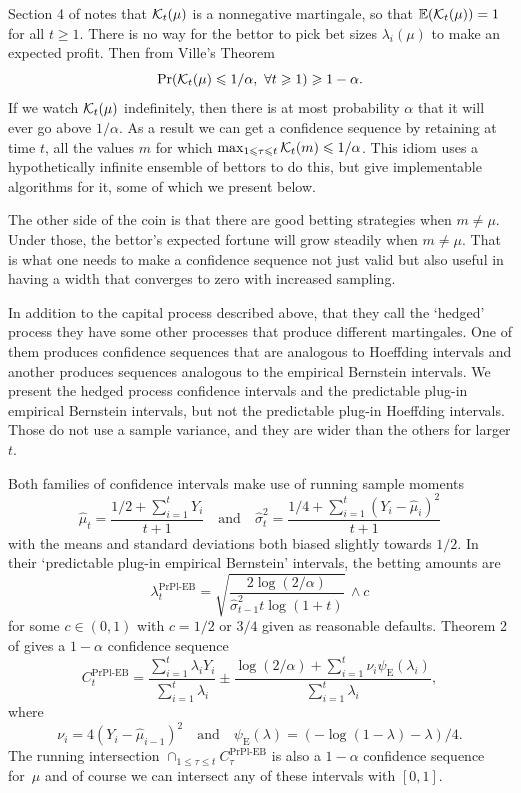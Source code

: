 \documentclass{article}
\newcommand{\art}[1]{\begingroup\color{blue}#1\endgroup}
\renewcommand{\le}{\leqslant}
\renewcommand{\ge}{\geqslant}
\newcommand{\e}{\mathbb{E}}
\newcommand{\prpleb}{\text{PrPl-EB}}
\newcommand{\eb}{\mathrm{E}}
\begin{document}
Section 4 of \cite{WauRam24a} notes that $\mathcal{K}_t(\mu)$ is
a \art{nonnegative} martingale, so that $\e(\ck_t(\mu))=1$ for all $t\ge1$.
There is no way for the bettor to pick bet sizes $\lambda_i(\mu)$
to make an expected profit.   \art{Then from Ville's Theorem}
$$
\Pr( \ck_t(\mu)\le 1/\alpha,\ \forall t\ge1)\ge1-\alpha.
$$
If we watch $\mathcal{K}_t(\mu)$ indefinitely, then
there is at most probability $\alpha$ that it will
ever go above $1/\alpha$.  As a result we can get
a confidence sequence by retaining at time $t$,
all the values $m$ for 
which $\max_{1\le\tau\le t}\ck_t(m)\le1/\alpha$.
This idiom uses a hypothetically infinite ensemble of 
bettors to do this, but \cite{WauRam24a} give
implementable algorithms for it, some of which we present below.

The other side of the coin is that there are good betting
strategies when $m\ne\mu$.  Under those, the bettor's expected fortune
will grow steadily when $m\ne\mu$. That is what one needs
to make a confidence sequence not just valid but also useful
in having a width that converges to zero with increased sampling.




In addition to the capital process described
above, \art{that they call the `hedged' process}
they have some other processes that
produce different martingales. One of them produces confidence
sequences that are analogous to Hoeffding intervals
and another produces sequences analogous to the
empirical Bernstein intervals.  \art{We present the 
hedged process confidence intervals and the
predictable plug-in empirical Bernstein
intervals, but not the predictable plug-in Hoeffding intervals. Those
do not use a sample variance, and they are wider than the others for 
larger $t$.}


Both families of confidence intervals make use of running sample moments
$$
\hat\mu_t = \frac{1/2+\sum_{i=1}^tY_i}{t+1}
\quad\text{and}\quad
\hat\sigma^2_t = \frac{1/4+\sum_{i=1}^t(Y_i-\hat\mu_i)^2}{t+1}
$$
with the means and standard deviations 
both biased slightly towards $1/2$.
\art{In their `predictable plug-in empirical Bernstein'
intervals, the betting amounts are}
$$
\lambda_t^\prpleb  = \sqrt{\frac{2\log(2/\alpha)}{\hat\sigma^2_{t-1}t\log(1+t)}}\,\wedge c
$$
for some $c\in(0,1)$ with $c=1/2$ or $3/4$
given as reasonable defaults. 
Theorem 2 of \cite{WauRam24a} 
gives a $1-\alpha$ confidence sequence
$$
C_t^\prpleb = \frac{\sum_{i=1}^t\lambda_iY_i}{\sum_{i=1}^t\lambda_i}
\pm \frac{\log(2/\alpha)+\sum_{i=1}^t\nu_i\psi_{\eb}(\lambda_i)}{\sum_{i=1}^t\lambda_i},
$$
where
$$
\nu_i = 4(Y_i-\hat\mu_{i-1})^2
\quad\text{and}\quad \psi_{\eb}(\lambda)
= (-\log(1-\lambda)-\lambda)/4.
$$
The running intersection
$\cap_{1\le\tau\le t}C^\prpleb_\tau$
is also a $1-\alpha$ confidence sequence for~$\mu$ and
of course we can intersect any of these intervals with $[0,1]$.
\end{document}

